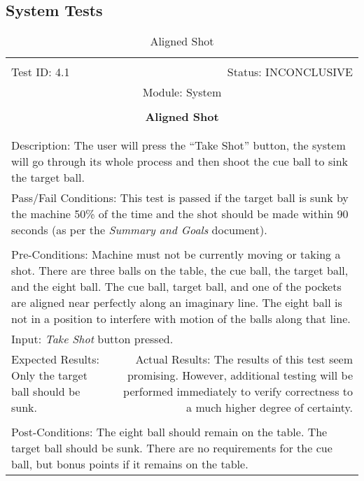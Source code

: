 \documentclass[titlepage]{article}
\begin{document}
\subsection{System Tests}
\begin{center}
\begin{table}[h!]
\begin{tabular}{|l r|}\hline&\\[-2mm]
	Test ID: 4.1	&Status: INCONCLUSIVE\\[-3mm]
	\multicolumn{2}{|c|}{Module: System}\\&\\
	\multicolumn{2}{|c|}{\textbf{\large{Aligned Shot}}}\\&\\\hline&\\[-3mm]
	\multicolumn{2}{|p{\textwidth}|}{Description: The user will press the ``Take Shot'' button, the system will go through its whole process and then shoot the cue ball to sink the target ball.}\\\hline
	\multicolumn{2}{|p{\textwidth}|}{Pass/Fail Conditions: This test is passed if the target ball is sunk by the machine 50\% of the time and the shot should be made within 90 seconds (as per the \textit{Summary and Goals} document).}\\[1mm]\hline&\\[-3mm]
	\multicolumn{2}{|p{\textwidth}|}{Pre-Conditions: Machine must not be currently moving or taking a shot. There are three balls on the table, the cue ball, the target ball, and the eight ball. The cue ball, target ball, and one of the pockets are aligned near perfectly along an imaginary line. The eight ball is not in a position to interfere with motion of the balls along that line.}\\[4mm]
	\multicolumn{2}{|p{\textwidth}|}{Input: \textit{Take Shot} button pressed.}\\[2mm]\hline
	\multicolumn{1}{|p{0.49\textwidth}}{Expected Results: Only the target ball should be sunk.}	&\multicolumn{1}{|p{0.45\textwidth}|}{Actual Results: The results of this test seem promising. However, additional testing will be performed immediately to verify correctness to a much higher degree of certainty.}\\\hline&\\[-3mm]
	\multicolumn{2}{|p{\textwidth}|}{Post-Conditions: The eight ball should remain on the table. The target ball should be sunk. There are no requirements for the cue ball, but bonus points if it remains on the table.}\\\hline
\end{tabular}
\caption{Aligned Shot}
\end{table}
\end{center}
\end{document}
